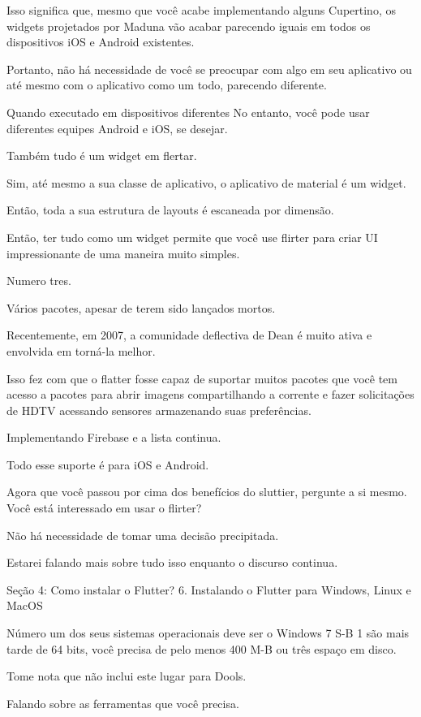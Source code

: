Isso significa que, mesmo que você acabe implementando alguns Cupertino, os widgets projetados por Maduna vão acabar parecendo iguais em todos os dispositivos iOS e Android existentes.

Portanto, não há necessidade de você se preocupar com algo em seu aplicativo ou até mesmo com o aplicativo como um todo, parecendo diferente.

Quando executado em dispositivos diferentes No entanto, você pode usar diferentes equipes Android e iOS, se desejar.

Também tudo é um widget em flertar.

Sim, até mesmo a sua classe de aplicativo, o aplicativo de material é um widget.

Então, toda a sua estrutura de layouts é escaneada por dimensão.

Então, ter tudo como um widget permite que você use flirter para criar UI impressionante de uma maneira muito simples.

Numero tres.

Vários pacotes, apesar de terem sido lançados mortos.

Recentemente, em 2007, a comunidade deflectiva de Dean é muito ativa e envolvida em torná-la melhor.

Isso fez com que o flatter fosse capaz de suportar muitos pacotes que você tem acesso a pacotes para abrir imagens compartilhando a corrente e fazer solicitações de HDTV acessando sensores armazenando suas preferências.

Implementando Firebase e a lista continua.

Todo esse suporte é para iOS e Android.

Agora que você passou por cima dos benefícios do sluttier, pergunte a si mesmo. Você está interessado em usar o flirter?

Não há necessidade de tomar uma decisão precipitada.

Estarei falando mais sobre tudo isso enquanto o discurso continua.


Seção 4: Como instalar o Flutter?
6. Instalando o Flutter para Windows, Linux e MacOS

Número um dos seus sistemas operacionais deve ser o Windows 7 S-B 1 são mais tarde de 64 bits, você precisa de pelo menos 400 M-B ou três espaço em disco.

Tome nota que não inclui este lugar para Dools.

Falando sobre as ferramentas que você precisa.

